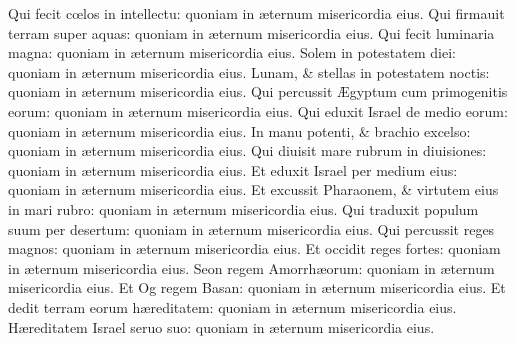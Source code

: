 \documentclass[a5paper,10pt]{book}
\def\ae{æ}
\def\AE{Æ}
\def\oe{œ}
\begin{document}
\begin{multicols*}{2}
\newline \color{red} Q\color{black}ui fecit c\oe los in intellectu: quoniam in \ae ternum misericordia eius.
\newline \color{red} Q\color{black}ui firmauit terram super aquas: quoniam in \ae ternum misericordia eius.
\newline \color{red} Q\color{black}ui fecit luminaria magna: quoniam in \ae ternum misericordia eius.
\newline \color{red} S\color{black}olem in potestatem diei: quoniam in \ae ternum misericordia eius.
\newline \color{red} L\color{black}unam, \& stellas in potestatem noctis: quoniam in \ae ternum misericordia eius.
\newline \color{red} Q\color{black}ui percussit \AE gyptum cum primogenitis eorum: quoniam in \ae ternum misericordia eius.
\newline \color{red} Q\color{black}ui eduxit Israel de medio eorum: quoniam in \ae ternum misericordia eius.
\newline \color{red} I\color{black}n manu potenti, \& brachio excelso: quoniam in \ae ternum misericordia eius.
\newline \color{red} Q\color{black}ui diuisit mare rubrum in diuisiones: quoniam in \ae ternum misericordia eius.
\newline \color{red} E\color{black}t eduxit Israel per medium eius: quoniam in \ae ternum misericordia eius.
\newline \color{red} E\color{black}t excussit Pharaonem, \& virtutem eius in mari rubro: quoniam in \ae ternum misericordia eius.
\newline \color{red} Q\color{black}ui traduxit populum suum per desertum: quoniam in \ae ternum misericordia eius.
\newline \color{red} Q\color{black}ui percussit reges magnos: quoniam in \ae ternum misericordia eius.
\newline \color{red} E\color{black}t occidit reges fortes: quoniam in \ae ternum misericordia eius.
\newline \color{red} S\color{black}eon regem Amorrh\ae orum: quoniam in \ae ternum misericordia eius.
\newline \color{red} E\color{black}t Og regem Basan: quoniam in \ae ternum misericordia eius.
\newline \color{red} E\color{black}t dedit terram eorum h\ae reditatem: quoniam in \ae ternum misericordia eius.
\newline \color{red} H\color{black}\ae reditatem Israel seruo suo: quoniam in \ae ternum misericordia eius.

\end{multicols*}
\end{document}
